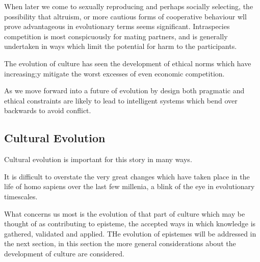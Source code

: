 When later we come to sexually reproducing and perhaps socially selecting, the possibility that altruism, or more cautious forms of cooperative behaviour wll prove advantageous in evolutionary terms seems significant.
Intraspecies competition is most conspicuously for mating partners, and is generally undertaken in ways which limit the potential for harm to the participants.

The evolution of culture has seen the development of ethical norms which have increasing;y mitigate the worst excesses of even economic competition.

As we move forward into a future of evolution by design both pragmatic and ethical constraints are likely to lead to intelligent systems which bend over backwards to avoid conflict.

\subsection{Cultural Evolution}

Cultural evolution is important for this story in many ways.

It is difficult to overstate the very great changes which have taken place in the life of homo sapiens over the last few millenia, a blink of the eye in evolutionary timescales.

What concerns us most is the evolution of that part of culture which may be thought of as contributing to episteme, the accepted ways in which knowledge is gathered, validated and applied.
THe evolution of epistemes will be addressed in the next section, in this section the more general considerations about the development of culture are considered.



